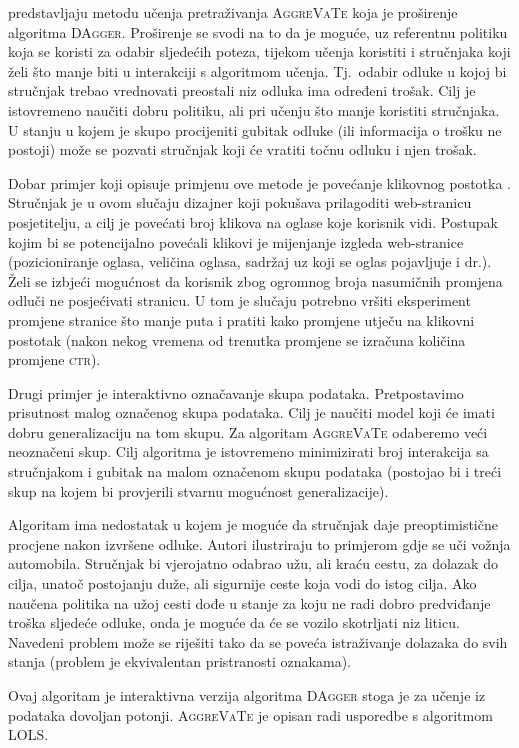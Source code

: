 \citet{ross2014reinforcement} predstavljaju metodu učenja pretraživanja
\textsc{AggreVaTe}  koja je
proširenje algoritma \textsc{DAgger}. Proširenje se svodi na to da je moguće, uz
referentnu politiku koja se koristi za odabir sljedećih poteza, tijekom učenja
koristiti i stručnjaka koji želi što manje biti u interakciji s algoritmom
učenja. Tj.~odabir odluke u kojoj bi stručnjak trebao vrednovati preostali
niz odluka ima određeni trošak. Cilj je istovremeno naučiti dobru politiku, ali
pri učenju što manje koristiti stručnjaka. U stanju u kojem je skupo procijeniti
gubitak odluke (ili informacija o trošku ne postoji) može se pozvati stručnjak
koji će vratiti točnu odluku i njen trošak.

Dobar primjer koji opisuje primjenu ove metode je povećanje klikovnog postotka
. Stručnjak je u ovom slučaju dizajner koji
pokušava prilagoditi web-stranicu posjetitelju, a cilj je povećati broj klikova
na oglase koje korisnik vidi. Postupak kojim bi se potencijalno povećali klikovi
je mijenjanje izgleda web-stranice (pozicioniranje oglasa, veličina oglasa,
sadržaj uz koji se oglas pojavljuje i dr.). Želi se izbjeći mogućnost da
korisnik zbog ogromnog broja nasumičnih promjena odluči ne posjećivati stranicu.
U tom je slučaju potrebno vršiti eksperiment promjene stranice što manje puta i
pratiti kako promjene utječu na klikovni postotak (nakon nekog vremena od
trenutka promjene se izračuna količina promjene \textsc{ctr}).

Drugi primjer je interaktivno označavanje skupa podataka. Pretpostavimo
prisutnost malog označenog skupa podataka. Cilj je naučiti model koji će imati
dobru generalizaciju na tom skupu. Za algoritam \textsc{AggreVaTe} odaberemo
veći neoznačeni skup. Cilj algoritma je istovremeno minimizirati broj
interakcija sa stručnjakom i gubitak na malom označenom skupu podataka (postojao
bi i treći skup na kojem bi provjerili stvarnu mogućnost generalizacije).

Algoritam ima nedostatak u kojem je moguće da stručnjak daje preoptimistične
procjene nakon izvršene odluke. Autori ilustriraju to primjerom gdje se uči
vožnja automobila. Stručnjak bi vjerojatno odabrao užu, ali kraću cestu, za
dolazak do cilja, unatoč postojanju duže, ali sigurnije ceste koja vodi do istog
cilja. Ako naučena politika na užoj cesti dođe u stanje za koju ne radi dobro
predviđanje troška sljedeće odluke, onda je moguće da će se vozilo skotrljati
niz liticu. Navedeni problem može se riješiti tako da se poveća istraživanje
dolazaka do svih stanja (problem je ekvivalentan pristranosti oznakama).

Ovaj algoritam je interaktivna verzija algoritma \textsc{DAgger} stoga je za
učenje iz podataka dovoljan potonji. \textsc{AggreVaTe} je opisan radi usporedbe
s algoritmom \textsc{LOLS}.
